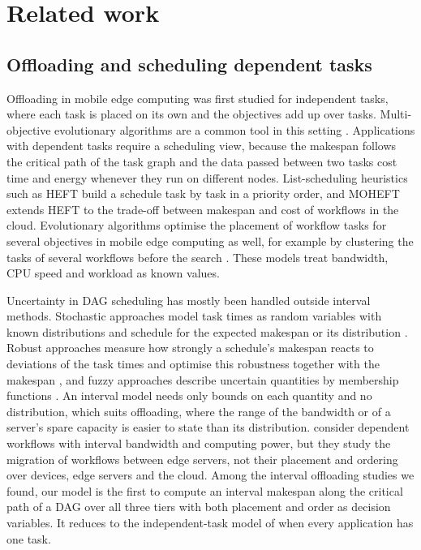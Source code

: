 \section{Related work}
\label{sec:related}

\subsection{Offloading and scheduling dependent tasks}
Offloading in mobile edge computing was first studied for independent tasks, where each task is placed on its own and
the objectives add up over tasks. Multi-objective evolutionary algorithms are a common tool in this setting
\citep{chai2023offloading}. Applications with dependent tasks require a scheduling view, because the makespan follows
the critical path of the task graph and the data passed between two tasks cost time and energy whenever they run on
different nodes. List-scheduling heuristics such as HEFT \citep{topcuoglu2002heft} build a schedule task by task in a
priority order, and MOHEFT \citep{durillo2014moheft} extends HEFT to the trade-off between makespan and cost of
workflows in the cloud. Evolutionary algorithms optimise the placement of workflow tasks for several objectives in
mobile edge computing as well, for example by clustering the tasks of several workflows before the search
\citep{pan2023multiworkflow}. These models treat bandwidth, CPU speed and workload as known values.

Uncertainty in DAG scheduling has mostly been handled outside interval methods. Stochastic approaches model task times
as random variables with known distributions and schedule for the expected makespan or its distribution
\citep{tang2011stochastic,li2015stochastic}. Robust approaches measure how strongly a schedule's makespan reacts to
deviations of the task times and optimise this robustness together with the makespan \citep{canon2010robust}, and
fuzzy approaches describe uncertain quantities by membership functions \citep{farid2020fuzzy}. An interval model needs
only bounds on each quantity and no distribution, which suits offloading, where the range of the bandwidth or of a
server's spare capacity is easier to state than its distribution. \citet{shi2023workflowmigration} consider dependent
workflows with interval bandwidth and computing power, but they study the migration of workflows between edge servers,
not their placement and ordering over devices, edge servers and the cloud. Among the interval offloading studies we
found, our model is the first to compute an interval makespan along the critical path of a DAG over all three tiers
with both placement and order as decision variables. It reduces to the independent-task model of
\citet{jin2026imoeadqn} when every application has one task.

